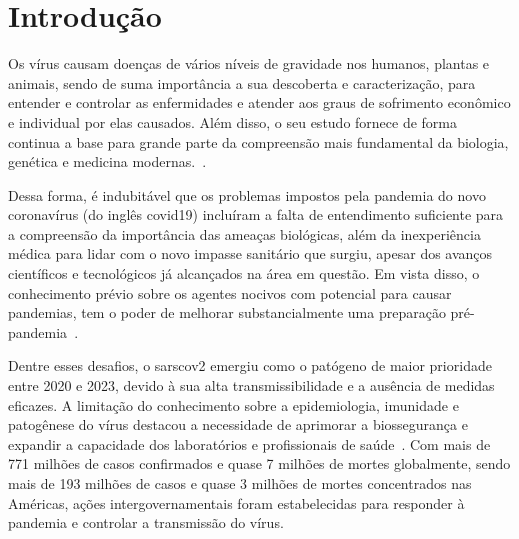 
\chapter{Introdução}

\setlength{\parskip}{0.3cm}

Os vírus causam doenças de vários níveis de gravidade nos humanos, plantas e animais, sendo de suma importância a sua descoberta e caracterização, para entender e controlar as enfermidades e atender aos graus de sofrimento econômico e individual por elas causados. Além disso, o seu estudo fornece de forma continua a base para grande parte da compreensão mais fundamental da biologia, genética e medicina modernas.~\cite{virology_edward_2007}.

Dessa forma, é indubitável que os problemas impostos pela pandemia do novo coronavírus (do inglês \gls{covid19}) incluíram a falta de entendimento suficiente para a compreensão da importância das ameaças biológicas, além da inexperiência médica para lidar com o novo impasse sanitário que surgiu, apesar dos avanços científicos e tecnológicos já alcançados na área em questão\cite{coronavirus_binsfeld_2020}. Em vista disso, o conhecimento prévio sobre os agentes nocivos com potencial para causar pandemias, tem o poder de melhorar substancialmente uma preparação pré-pandemia~\cite{behl_threat_2022}.

Dentre esses desafios, o \gls{sarscov2} emergiu como o patógeno de maior prioridade entre 2020 e 2023, devido à sua alta transmissibilidade e a ausência de medidas eficazes. A limitação do conhecimento sobre a epidemiologia, imunidade e patogênese do vírus destacou a necessidade de aprimorar a biossegurança e expandir a capacidade dos laboratórios e profissionais de saúde~\cite{sarscov2_covidsurg_2021,sarscov2_deigin_2021, multiple_kuchipudi_2022, efficacy_madhi_2021}. Com mais de 771 milhões de casos confirmados e quase 7 milhões de mortes globalmente, sendo mais de 193 milhões de casos e quase 3 milhões de mortes concentrados nas Américas\cite{who_covid19}, ações intergovernamentais foram estabelecidas para responder à pandemia e controlar a transmissão do vírus.

